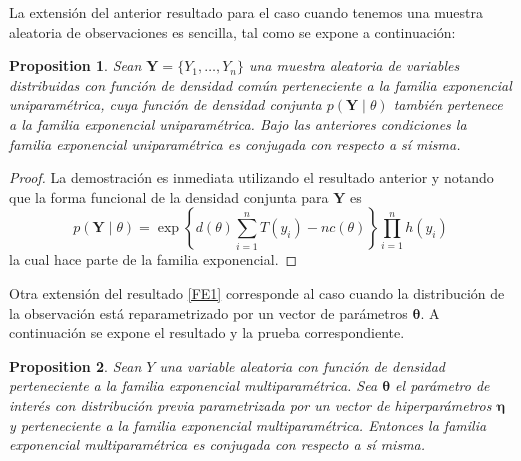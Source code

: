 \documentclass[
  spanish,
  letter]{book}
\newtheorem{proposition}{Proposition}[chapter]
\theoremstyle{definition}
\theoremstyle{definition}
\theoremstyle{definition}
\theoremstyle{remark}
\begin{document}
La extensión del anterior resultado para el caso cuando tenemos una muestra aleatoria de observaciones es sencilla, tal como se expone a continuación:
\begin{proposition}
\protect\hypertarget{prp:unnamed-chunk-19}{}{\label{prp:unnamed-chunk-19} }Sean \(\mathbf{Y}=\{Y_1, \ldots, Y_n\}\) una muestra aleatoria de variables distribuidas con función de densidad común perteneciente a la familia exponencial uniparamétrica, cuya función de densidad conjunta \(p(\mathbf{Y} \mid \theta)\) también pertenece a la familia exponencial uniparamétrica. Bajo las anteriores condiciones la familia exponencial uniparamétrica es conjugada con respecto a sí misma.
\end{proposition}

\begin{proof}
\iffalse{} {Proof. } \fi{}La demostración es inmediata utilizando el resultado anterior y notando que la forma funcional de la densidad conjunta para \(\mathbf{Y}\) es
\begin{equation}
p(\mathbf{Y} \mid \theta)=\exp\left\{d(\theta)\sum_{i=1}^nT(y_i)-nc(\theta)\right\}\prod_{i=1}^nh(y_i)
\end{equation}
la cual hace parte de la familia exponencial.
\end{proof}

Otra extensión del resultado \ref{FE1} corresponde al caso cuando la distribución de la observación está reparametrizado por un vector de parámetros \(\boldsymbol \theta\). A continuación se expone el resultado y la prueba correspondiente.

\begin{proposition}
\protect\hypertarget{prp:unnamed-chunk-21}{}{\label{prp:unnamed-chunk-21} }Sean \(Y\) una variable aleatoria con función de densidad perteneciente a la familia exponencial multiparamétrica. Sea \(\boldsymbol \theta\) el parámetro de interés con distribución \emph{previa} parametrizada por un vector de hiperparámetros \(\boldsymbol \eta\) y perteneciente a la familia exponencial multiparamétrica. Entonces la familia exponencial multiparamétrica es conjugada con respecto a sí misma.
\end{proposition}
\end{document}
